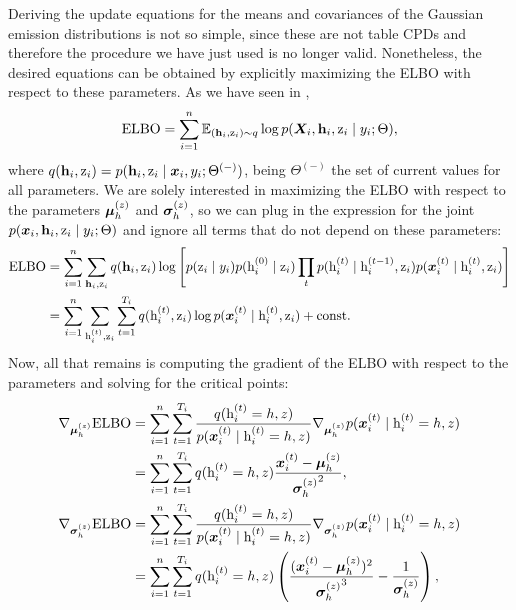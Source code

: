 Deriving the update equations for the means and covariances of the Gaussian emission distributions is not so simple, since these are not table CPDs and therefore the procedure we have just used is no longer valid. Nonetheless, the desired equations can be obtained by explicitly maximizing the ELBO with respect to these parameters. As we have seen in ,
\begin{equation}
	\mathrm{ELBO} = \sum_{i=1}^{n} \mathbb{E}_{({\mathbf{h}}_i,{\textnormal{z}}_i) \sim q} \log p({\bm{X}}_i, {\mathbf{h}}_i, {\textnormal{z}}_i \mid y_i; \Theta),
\end{equation}
where $q({\mathbf{h}}_i,{\textnormal{z}}_i) = p({\mathbf{h}}_i, {\textnormal{z}}_i \mid {\bm{x}}_i, y_i; \Theta^{(-)})$, being $\Theta^{(-)}$ the set of current values for all parameters. We are solely interested in maximizing the ELBO with respect to the parameters ${\bm{\mu}}^{(z)}_h$ and ${\bm{\sigma}}^{(z)}_h$, so we can plug in the expression for the joint $p({\bm{x}}_i, {\mathbf{h}}_i, {\textnormal{z}}_i \mid y_i; \Theta)$ and ignore all terms that do not depend on these parameters:
\begin{align}
	\mathrm{ELBO} &= \sum_{i=1}^n \sum_{{\mathbf{h}}_i, {\textnormal{z}}_i} q({\mathbf{h}}_i,{\textnormal{z}}_i) \log \left[p({\textnormal{z}}_i \mid y_i) p({\textnormal{h}}^{(0)}_i \mid {\textnormal{z}}_i) \prod_t p({\textnormal{h}}^{(t)}_i \mid {\textnormal{h}}^{(t-1)}_i, {\textnormal{z}}_i) p({\bm{x}}^{(t)}_i \mid {\textnormal{h}}^{(t)}_i, {\textnormal{z}}_i) \right] \nonumber\\
	&= \sum_{i=1}^n \sum_{{\textnormal{h}}^{(t)}_i, {\textnormal{z}}_i} \sum_{t=1}^{T_i} q({\textnormal{h}}^{(t)}_i, {\textnormal{z}}_i) \log p({\bm{x}}^{(t)}_i \mid {\textnormal{h}}^{(t)}_i, {\textnormal{z}}_i) + \text{const}.
\end{align}
Now, all that remains is computing the gradient of the ELBO with respect to the parameters and solving for the critical points:
\begin{align}
&\nabla_{\vmu^{(z)}_h} \mathrm{ELBO} = \sum_{i=1}^n \sum_{t=1}^{T_i} \frac{q(\rh^{(t)}_i=h, z)}{p(\vx^{(t)}_i \mid \rh^{(t)}_i=h, z)} \nabla_{\vmu^{(z)}_h} p(\vx^{(t)}_i \mid \rh^{(t)}_i=h, z) \nonumber\\
&\hphantom{\nabla_{\vmu^{(z)}_h} \mathrm{ELBO}} = \sum_{i=1}^n  \sum_{t=1}^{T_i} q(\rh^{(t)}_i=h, z) \frac{\vx^{(t)}_i - \vmu^{(z)}_h}{{\vsigma^{(z)}_h}^2}, \\
&\nabla_{\vsigma^{(z)}_h} \mathrm{ELBO} = \sum_{i=1}^n \sum_{t=1}^{T_i} \frac{q(\rh^{(t)}_i=h, z)}{p(\vx^{(t)}_i \mid \rh^{(t)}_i=h, z)} \nabla_{\vsigma^{(z)}_h} p(\vx^{(t)}_i \mid \rh^{(t)}_i=h, z) \nonumber\\
&\hphantom{\nabla_{\vsigma^{(z)}_h} \mathrm{ELBO}} = \sum_{i=1}^n  \sum_{t=1}^{T_i} q(\rh^{(t)}_i=h, z) \left(\frac{(\vx^{(t)}_i - \vmu^{(z)}_h)^2}{{\vsigma^{(z)}_h}^3} - \frac{1}{\vsigma^{(z)}_h}\right),
\end{align}
